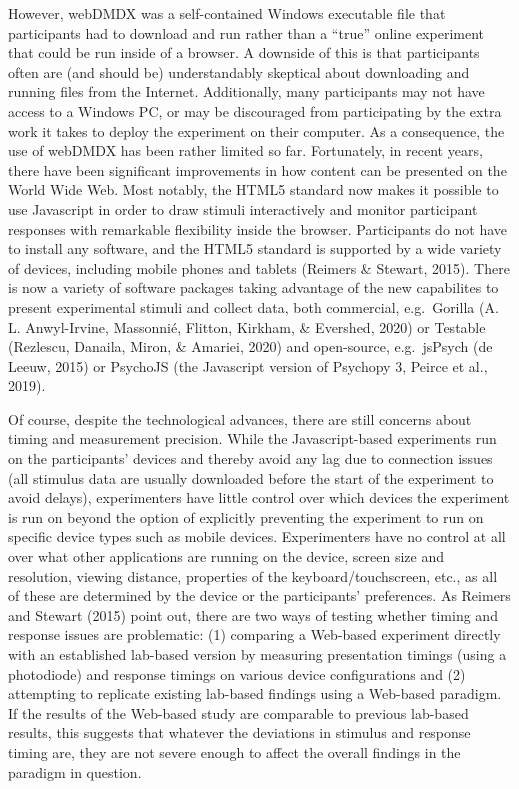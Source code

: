 \documentclass[
  english,
  man]{apa6}
\begin{document}
However, webDMDX was a self-contained Windows executable file that participants had to download and run rather than a ``true'' online experiment that could be run inside of a browser. A downside of this is that participants often are (and should be) understandably skeptical about downloading and running files from the Internet. Additionally, many participants may not have access to a Windows PC, or may be discouraged from participating by the extra work it takes to deploy the experiment on their computer. As a consequence, the use of webDMDX has been rather limited so far. Fortunately, in recent years, there have been significant improvements in how content can be presented on the World Wide Web. Most notably, the HTML5 standard now makes it possible to use Javascript in order to draw stimuli interactively and monitor participant responses with remarkable flexibility inside the browser. Participants do not have to install any software, and the HTML5 standard is supported by a wide variety of devices, including mobile phones and tablets (Reimers \& Stewart, 2015). There is now a variety of software packages taking advantage of the new capabilites to present experimental stimuli and collect data, both commercial, e.g.~Gorilla (A. L. Anwyl-Irvine, Massonnié, Flitton, Kirkham, \& Evershed, 2020) or Testable (Rezlescu, Danaila, Miron, \& Amariei, 2020) and open-source, e.g.~jsPsych (de Leeuw, 2015) or PsychoJS (the Javascript version of Psychopy 3, Peirce et al., 2019).

Of course, despite the technological advances, there are still concerns about timing and measurement precision. While the Javascript-based experiments run on the participants' devices and thereby avoid any lag due to connection issues (all stimulus data are usually downloaded before the start of the experiment to avoid delays), experimenters have little control over which devices the experiment is run on beyond the option of explicitly preventing the experiment to run on specific device types such as mobile devices. Experimenters have no control at all over what other applications are running on the device, screen size and resolution, viewing distance, properties of the keyboard/touchscreen, etc., as all of these are determined by the device or the participants' preferences. As Reimers and Stewart (2015) point out, there are two ways of testing whether timing and response issues are problematic: (1) comparing a Web-based experiment directly with an established lab-based version by measuring presentation timings (using a photodiode) and response timings on various device configurations and (2) attempting to replicate existing lab-based findings using a Web-based paradigm. If the results of the Web-based study are comparable to previous lab-based results, this suggests that whatever the deviations in stimulus and response timing are, they are not severe enough to affect the overall findings in the paradigm in question.
\end{document}
